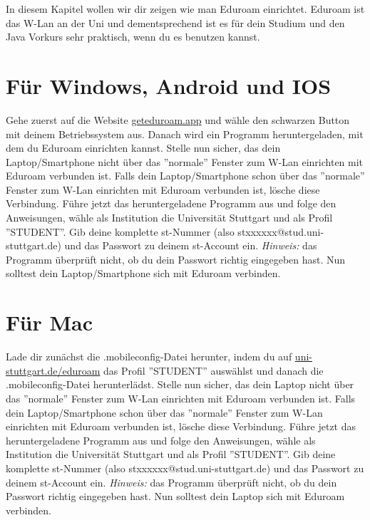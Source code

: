 
\label{ex1}

In diesem Kapitel wollen wir dir zeigen wie man Eduroam einrichtet. Eduroam ist das W-Lan an der Uni und dementsprechend ist es für dein Studium und den Java Vorkurs sehr praktisch, wenn du es benutzen kannst.
 
\section*{Für Windows, Android und IOS}
Gehe zuerst auf die Website \href{\eduroamurl}{geteduroam.app} und wähle den schwarzen Button mit deinem Betriebssystem aus. Danach wird ein Programm heruntergeladen, mit dem du Eduroam einrichten kannst.\newline
Stelle nun sicher, das dein Laptop/Smartphone nicht über das ''normale'' Fenster zum W-Lan einrichten mit Eduroam verbunden ist. Falls dein Laptop/Smartphone schon über das ''normale'' Fenster zum W-Lan einrichten mit Eduroam verbunden ist, lösche diese Verbindung.\newline
Führe jetzt das heruntergeladene Programm aus und folge den Anweisungen, wähle als Institution die Universität Stuttgart und als Profil ''STUDENT''. Gib deine komplette st-Nummer (also stxxxxxx@stud.uni-stuttgart.de) und das Passwort zu deinem st-Account ein.\newline
\textit{Hinweis:} das Programm überprüft nicht, ob du dein Passwort richtig eingegeben hast.\newline
Nun solltest dein Laptop/Smartphone sich mit Eduroam verbinden.\newline

\section*{Für Mac}
Lade dir zunächst die .mobileconfig-Datei herunter, indem du auf \href{\eduroamurllinux}{uni-stuttgart.de/eduroam} das Profil ''STUDENT'' auswählst und danach die .mobileconfig-Datei herunterlädst.\newline
Stelle nun sicher, das dein Laptop nicht über das ''normale'' Fenster zum W-Lan einrichten mit Eduroam verbunden ist. Falls dein Laptop/Smartphone schon über das ''normale'' Fenster zum W-Lan einrichten mit Eduroam verbunden ist, lösche diese Verbindung.\newline
Führe jetzt das heruntergeladene Programm aus und folge den Anweisungen, wähle als Institution die Universität Stuttgart und als Profil ''STUDENT''. Gib deine komplette st-Nummer (also stxxxxxx@stud.uni-stuttgart.de) und das Passwort zu deinem st-Account ein.\newline
\textit{Hinweis:} das Programm überprüft nicht, ob du dein Passwort richtig eingegeben hast.\newline
Nun solltest dein Laptop sich mit Eduroam verbinden.\newline


